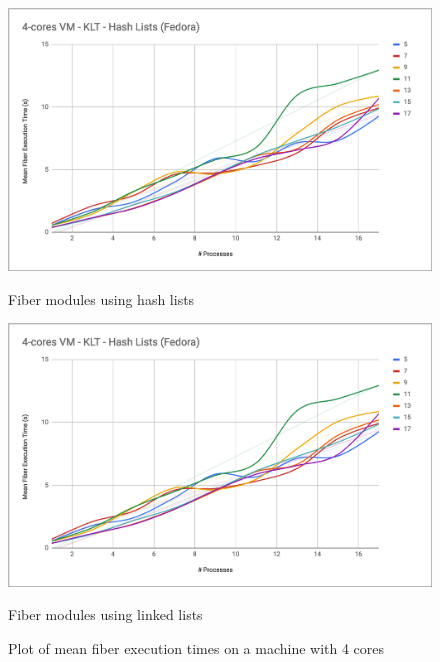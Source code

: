 \documentclass[a4paper,10pt]{article}
\begin{document}
 \begin{figure}[htb!]
   \centering
   \begin{minipage}{0.45\textwidth}%
     \centering
     \includegraphics[width=\textwidth]{imgs/bench-4cores-hash}
     \caption{Fiber modules using hash lists}
     \label{fig:2figsA}
   \end{minipage}%
   \qquad
   \begin{minipage}{0.45\textwidth}%
     \centering
     \includegraphics[width=\textwidth]{imgs/bench-4cores-hash}
     \caption{Fiber modules using linked lists}
     \label{fig:2figsB}%
   \end{minipage}%
   \caption{Plot of mean fiber execution times on a machine with 4 cores}
 \end{figure}
\end{document}
